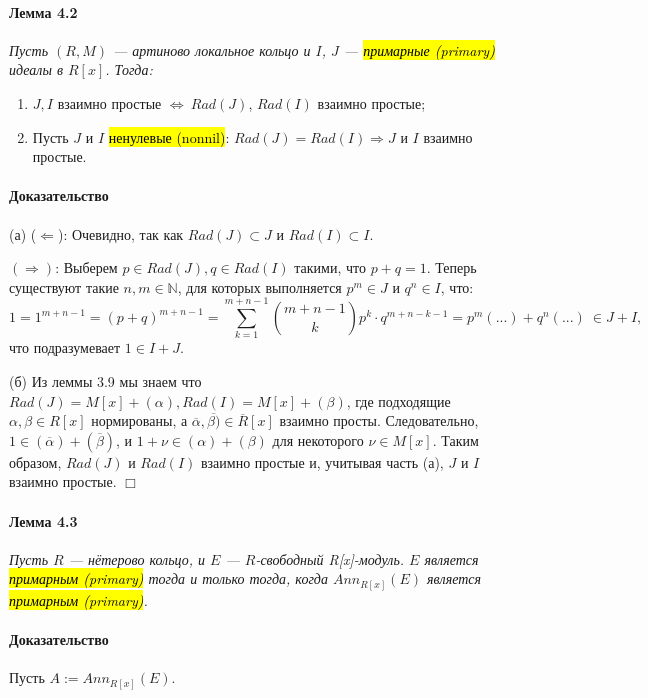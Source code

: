 \documentclass[a4paper,12pt]{article}
\begin{document}
\paragraph{Лемма 4.2}
{\itshape
Пусть $(R, M)$ --- артиново локальное кольцо и $I$, $J$ --- \hl{примарные (primary)} идеалы в $R[x]$. Тогда:
\renewcommand{\labelenumi}{(\asbuk{enumi})}
\begin{enumerate}
	\item $J, I$ взаимно простые $\Leftrightarrow ~ Rad(J)$, $Rad(I)$ взаимно простые;
	\item Пусть $J$ и $I$ \hl{ненулевые (nonnil)}: $Rad(J) = Rad(I) \Rightarrow J$ и $I$ взаимно простые.
\end{enumerate}
}

\paragraph{Доказательство}
(а) ($\Leftarrow$): Очевидно, так как $Rad(J) \subset J$ и $Rad(I) \subset I$.

$(\Rightarrow)$: Выберем $p \in Rad(J), q \in Rad(I)$ такими, что $p + q = 1$. Теперь существуют такие $n, m \in \mathbb{N}$, для которых выполняется $p^m \in J$ и $q^n \in I$, что:
$$
1 = 1^{m+n-1} = (p + q)^{m+n-1} = \sum_{k=1}^{m+n-1} \binom{m+n-1}{k}p^k \cdot q^{m+n-k-1} = p^m (...) + q^n (...) ~ \in J+I,
$$
что подразумевает $1 \in I+J$.

(б) Из леммы 3.9 мы знаем что $Rad(J) = M[x] + (\alpha), Rad(I) = M[x]+(\beta)$, где подходящие $\alpha, \beta \in R[x]$ нормированы, а $\overline{\alpha}, \overline{\beta)} \in \overline{R}[x]$ взаимно просты. Следовательно, $1 \in (\overline{\alpha}) + (\overline{\beta})$, и $1 + \nu \in (\alpha) + (\beta)$ для некоторого $\nu \in M[x]$. Таким образом, $Rad(J)$ и $Rad(I)$ взаимно простые и, учитывая часть (а), $J$ и $I$ взаимно простые.
$\Box$

\paragraph{Лемма 4.3}
{\itshape
Пусть $R$ --- нётерово кольцо, и $E$ --- $R$-свободный R[x]-модуль. $E$ является \hl{примарным (primary)} тогда и только тогда, когда $Ann_{R[x]}(E)$ является \hl{примарным (primary)}.
}

\paragraph{Доказательство}
Пусть $A := Ann_{R[x]}(E)$.
\end{document}
